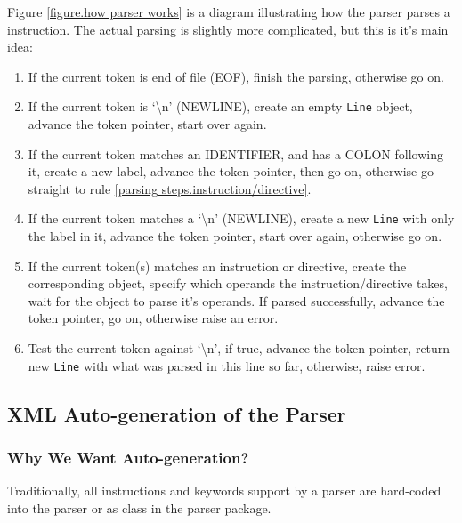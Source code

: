 Figure \ref{figure.how parser works} is a diagram illustrating how
the parser parses a instruction. The actual parsing is slightly
more complicated, but this is it's main idea:

\begin{enumerate}

\item If the current token is end of file (EOF), finish the
parsing, otherwise go on.

\item If the current token is `\textbackslash n' (NEWLINE), create
an empty \texttt{Line} object, advance the token pointer, start
over again.

\item If the current token matches an IDENTIFIER, and has a COLON
following it, create a new label, advance the token pointer, then go
on, otherwise go straight to rule \ref{parsing
steps.instruction/directive}.

\item If the current token matches a `\textbackslash n' (NEWLINE),
create a new \texttt{Line} with only the label in it, advance the
token pointer, start over again, otherwise go on.

\item \label{parsing steps.instruction/directive}If the current
token(s) matches an instruction or directive, create the
corresponding object, specify which operands the
instruction/directive takes, wait for the object to parse it's
operands. If parsed successfully, advance the token pointer, go
on, otherwise raise an error.

\item Test the current token against `\textbackslash n', if true,
advance the token pointer, return new \texttt{Line} with what was
parsed in this line so far, otherwise, raise error.

\end{enumerate}

\subsection{XML Auto-generation of the Parser} \label{XML generation of parser}

\subsubsection{Why We Want Auto-generation?}

Traditionally, all instructions and keywords support by a parser
are hard-coded into the parser or as class in the parser package.

